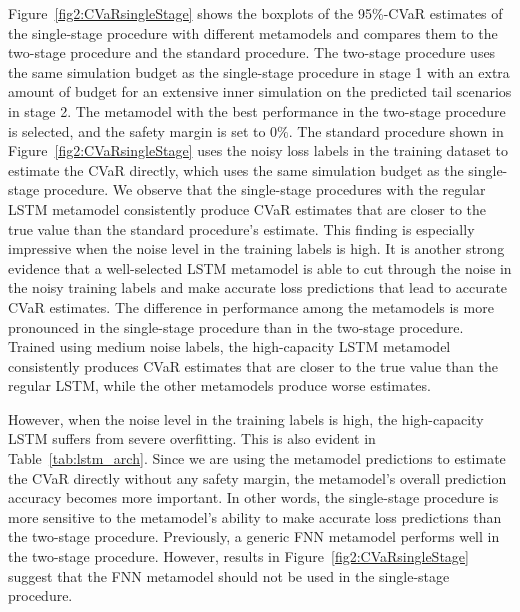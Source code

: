 Figure~\ref{fig2:CVaRsingleStage} shows the boxplots of the 95\%-CVaR estimates of the single-stage procedure with different metamodels and compares them to the two-stage procedure and the standard procedure.
The two-stage procedure uses the same simulation budget as the single-stage procedure in stage 1 with an extra amount of budget for an  extensive inner simulation on the predicted tail scenarios in stage 2.
The metamodel with the best performance in the two-stage procedure is selected, and the safety margin is set to $0\%$.
The standard procedure shown in Figure~\ref{fig2:CVaRsingleStage} uses the noisy loss labels in the training dataset to estimate the CVaR directly, which uses the same simulation budget as the single-stage procedure.
We observe that the single-stage procedures with the regular LSTM metamodel consistently produce CVaR estimates that are closer to the true value than the standard procedure's estimate.
This finding is especially impressive when the noise level in the training labels is high.
It is another strong evidence that a well-selected LSTM metamodel is able to cut through the noise in the noisy training labels and make accurate loss predictions that lead to accurate CVaR estimates.
The difference in performance among the metamodels is more pronounced in the single-stage procedure than in the two-stage procedure.
Trained using medium noise labels, the high-capacity LSTM metamodel consistently produces CVaR estimates that are closer to the true value than the regular LSTM, while the other metamodels produce worse estimates.

However, when the noise level in the training labels is high, the high-capacity LSTM suffers from severe overfitting. 
This is also evident in Table~\ref{tab:lstm_arch}.
Since we are using the metamodel predictions to estimate the CVaR directly without any safety margin, the metamodel's overall prediction accuracy becomes more important.
In other words, the single-stage procedure is more sensitive to the metamodel's ability to make accurate loss predictions than the two-stage procedure.
Previously, a generic FNN metamodel performs well in the two-stage procedure. 
However, results in Figure~\ref{fig2:CVaRsingleStage} suggest that the FNN metamodel should not be used in the single-stage procedure.

